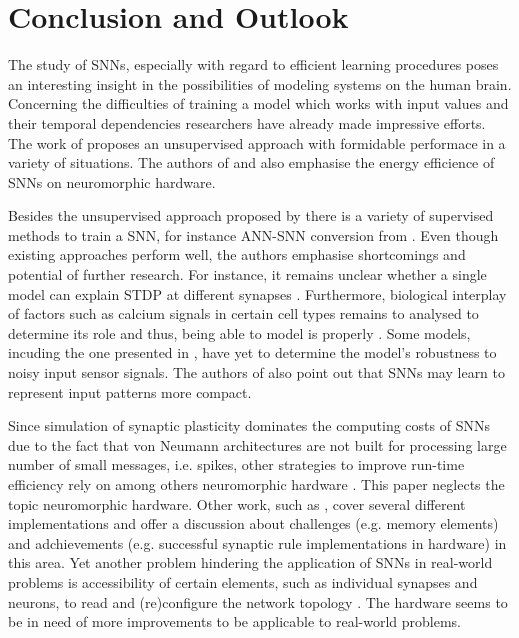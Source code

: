\section{Conclusion and Outlook}
\label{sec:conclusion}

The study of \acp{SNN}, especially with regard to efficient learning procedures poses an interesting insight in the possibilities of modeling
systems on the human brain.
Concerning the difficulties of training a model which works with input values and their temporal dependencies researchers have already made 
impressive efforts.
The work of \cite{SNN} proposes an unsupervised approach with formidable performace in a variety of situations.
The authors of \cite{SNN} and \cite{Synaptic_plasticity} also emphasise the energy efficience of \acp{SNN} on neuromorphic hardware.

Besides the unsupervised approach proposed by \cite{SNN} there is a variety of supervised methods to train a \ac{SNN}, 
for instance \ac{ANN}-\ac{SNN} conversion from \cite{DIET_SNN}.
Even though existing approaches perform well, the authors emphasise shortcomings and potential of further research.
For instance, it remains unclear whether a single model can explain \ac{STDP} at different synapses \cite{STDP_hebbian}.
Furthermore, biological interplay of factors such as calcium signals in certain cell types remains to analysed to determine its role and thus, being able to model is properly \cite{STDP_hebbian}.
Some models, incuding the one presented in \cite{object_detection_SNN}, have yet to determine the model's robustness to noisy input sensor signals.
The authors of \cite{object_detection_SNN} also point out that \acp{SNN} may learn to represent input patterns more compact.

Since simulation of synaptic plasticity dominates the computing costs of \acp{SNN} due to the fact that von Neumann architectures are not built for processing large number of small messages, i.e. spikes, 
other strategies to improve run-time efficiency rely on among others neuromorphic hardware \cite{simulation_STDP}.
This paper neglects the topic neuromorphic hardware.
Other work, such as \cite{Synaptic_plasticity}, 
cover several different implementations and offer a discussion about challenges (e.g. memory elements) and adchievements 
(e.g. successful synaptic rule implementations in hardware) in this area.
Yet another problem hindering the application of \acp{SNN} in real-world problems is accessibility of certain elements, such as individual synapses and neurons, 
to read and (re)configure the network topology \cite{hardware_STDP}.
The hardware seems to be in need of more improvements to be applicable to real-world problems.